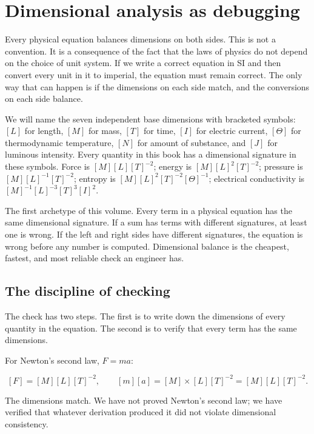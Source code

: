 \section{Dimensional analysis as debugging}

Every physical equation balances dimensions on both sides. This is
not a convention. It is a consequence of the fact that the laws of
physics do not depend on the choice of unit system. If we write a
correct equation in SI and then convert every unit in it to imperial,
the equation must remain correct. The only way that can happen is if
the dimensions on each side match, and the conversions on each side
balance.

We will name the seven independent base dimensions with bracketed
symbols: $[L]$ for length, $[M]$ for mass, $[T]$ for time, $[I]$ for
electric current, $[\Theta]$ for thermodynamic temperature, $[N]$ for
amount of substance, and $[J]$ for luminous intensity. Every quantity
in this book has a dimensional signature in these symbols. Force is
$[M][L][T]^{-2}$; energy is $[M][L]^{2}[T]^{-2}$; pressure is
$[M][L]^{-1}[T]^{-2}$; entropy is $[M][L]^{2}[T]^{-2}[\Theta]^{-1}$;
electrical conductivity is $[M]^{-1}[L]^{-3}[T]^{3}[I]^{2}$.

\begin{archetype}
The first archetype of this volume. Every term in a physical equation
has the same dimensional signature. If a sum has terms with different
signatures, at least one is wrong. If the left and right sides have
different signatures, the equation is wrong before any number is
computed. Dimensional balance is the cheapest, fastest, and most
reliable check an engineer has.
\end{archetype}

\subsection{The discipline of checking}

The check has two steps. The first is to write down the dimensions of
every quantity in the equation. The second is to verify that every
term has the same dimensions.

For Newton's second law, $F = ma$:

\[
[F] = [M][L][T]^{-2}, \qquad
[m][a] = [M] \times [L][T]^{-2} = [M][L][T]^{-2}.
\]

The dimensions match. We have not proved Newton's second law; we have
verified that whatever derivation produced it did not violate
dimensional consistency.


